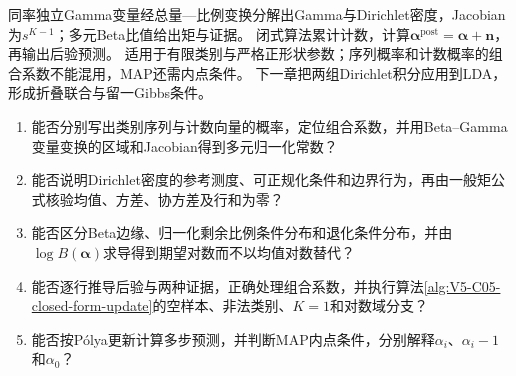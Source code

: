 \begin{SLCompactClosure}
\label{struct:V5-C05-CH36}
{同率独立Gamma变量经总量—比例变换分解出Gamma与Dirichlet密度，Jacobian为$s^{K-1}$；多元Beta比值给出矩与证据。}
{闭式算法累计计数，计算$\boldsymbol\alpha^{\mathrm{post}}=\boldsymbol\alpha+\boldsymbol n$，再输出后验预测。}
{适用于有限类别与严格正形状参数；序列概率和计数概率的组合系数不能混用，MAP还需内点条件。}
{下一章把两组Dirichlet积分应用到LDA，形成折叠联合与留一Gibbs条件。}

\label{struct:V5-C05-CH37}
\begin{selfcheckbox}
\small
\begin{enumerate}[leftmargin=2.2em,itemsep=0.15em,topsep=0.25em,parsep=0pt]
  \item 能否分别写出类别序列与计数向量的概率，定位组合系数，并用Beta--Gamma变量变换的区域和Jacobian得到多元归一化常数？
  \item 能否说明Dirichlet密度的参考测度、可正规化条件和边界行为，再由一般矩公式核验均值、方差、协方差及行和为零？
  \item 能否区分Beta边缘、归一化剩余比例条件分布和退化条件分布，并由$\log B(\boldsymbol\alpha)$求导得到期望对数而不以均值对数替代？
  \item 能否逐行推导后验与两种证据，正确处理组合系数，并执行算法\ref{alg:V5-C05-closed-form-update}的空样本、非法类别、$K=1$和对数域分支？
  \item 能否按Pólya更新计算多步预测，并判断MAP内点条件，分别解释$\alpha_i$、$\alpha_i-1$和$\alpha_0$？
\end{enumerate}
\end{selfcheckbox}
\end{SLCompactClosure}
